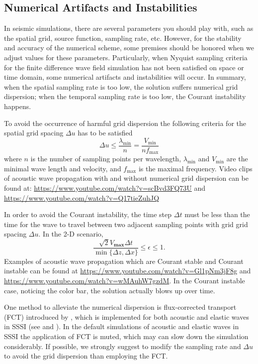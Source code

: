 \documentclass[11pt]{article}
\theoremstyle{plain}
\theoremstyle{definition}
\theoremstyle{remark}
\numberwithin{equation}{section}
\begin{document}
\subsection{Numerical Artifacts and Instabilities}
In seismic simulations, there are several parameters you should play with, such as the spatial grid, source function, sampling rate, etc. However, 
for the stability and accuracy of the numerical scheme, some premises should be honored when we adjust values for these parameters.  
Particularly, when Nyquist sampling criteria for the finite difference wave field simulation has not been satisfied on space or time domain, some numerical artifacts and instabilities will occur. In summary, when the spatial sampling rate is too low,  the solution suffers numerical grid dispersion; when the temporal sampling rate is too low, the Courant instability happens.

To avoid the occurrence of harmful grid dispersion the following criteria for the spatial grid spacing $\Delta u$ has to be satisfied
\begin{equation}
  \Delta u \leq \frac{\lambda_{\min}}{n} = \frac{V_{\min}}{nf_{\max}}
\end{equation}
where $n$ is the number of sampling points per wavelength, $\lambda_{\min}$ and $V_{\min}$ are the minimal wave length and velocity, and $f_{\max}$ is the maximal frequency. 
Video clips of acoustic wave propagation with and without numerical grid dispersion can be found at:
\url{https://www.youtube.com/watch?v=scBvd3FQ73U} and \url{https://www.youtube.com/watch?v=Q17tieZuhJQ}

In order to avoid the Courant instability, the time step $\Delta t$ must be less than the time for the wave to travel between two 
adjacent sampling points with grid grid spacing $\Delta u$. In the 2-D scenario,
\begin{equation}
\frac{\sqrt{2}V_{\textbf{max}}\Delta t}{\min\{\Delta z, \Delta x\}}\le \epsilon \le 1.
\end{equation}
Examples of acoustic wave propagation which are Courant stable and Courant instable can be found at
\url{https://www.youtube.com/watch?v=Gl1pNm3jF8g}  and \url{https://www.youtube.com/watch?v=wMAuhW7gzdM}. 
In the Courant instable case, noticing the color bar, the solution actually blows up over time.

One method to alleviate the numerical dispersion is flux-corrected transport (FCT) introduced by \cite{Fei:1995aa}, 
which is implemented for both acoustic and elastic waves in SSSI (see  and ).
In the default simulations of acoustic and elastic waves in SSSI the application of FCT is muted, which may can slow down the 
simulation considerably. If possible, we strongly suggest to modify the sampling rate and $\Delta u$ 
to avoid the grid dispersion than employing the FCT.  
\end{document}
